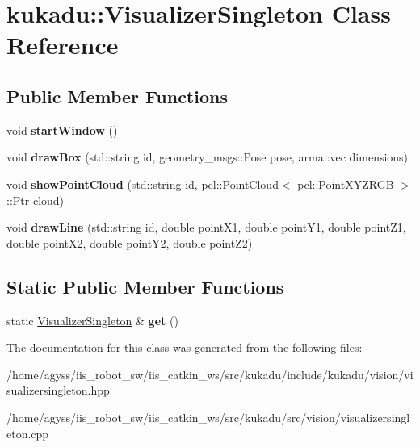 \hypertarget{classkukadu_1_1VisualizerSingleton}{}\section{kukadu\+:\+:Visualizer\+Singleton Class Reference}
\label{classkukadu_1_1VisualizerSingleton}
\subsection*{Public Member Functions}
\begin{DoxyCompactItemize}
\item 
void {\bfseries start\+Window} ()\hypertarget{classkukadu_1_1VisualizerSingleton_a79f0e92760dae5616f9534ee8033aa6d}{}\label{classkukadu_1_1VisualizerSingleton_a79f0e92760dae5616f9534ee8033aa6d}

\item 
void {\bfseries draw\+Box} (std\+::string id, geometry\+\_\+msgs\+::\+Pose pose, arma\+::vec dimensions)\hypertarget{classkukadu_1_1VisualizerSingleton_a153c7d591441f580b1a1599ee0184034}{}\label{classkukadu_1_1VisualizerSingleton_a153c7d591441f580b1a1599ee0184034}

\item 
void {\bfseries show\+Point\+Cloud} (std\+::string id, pcl\+::\+Point\+Cloud$<$ pcl\+::\+Point\+X\+Y\+Z\+R\+GB $>$\+::Ptr cloud)\hypertarget{classkukadu_1_1VisualizerSingleton_a6047d1a4619dd0fd7bcd8e684c04c946}{}\label{classkukadu_1_1VisualizerSingleton_a6047d1a4619dd0fd7bcd8e684c04c946}

\item 
void {\bfseries draw\+Line} (std\+::string id, double point\+X1, double point\+Y1, double point\+Z1, double point\+X2, double point\+Y2, double point\+Z2)\hypertarget{classkukadu_1_1VisualizerSingleton_aa6f85314a007cf7da65321d947977fbd}{}\label{classkukadu_1_1VisualizerSingleton_aa6f85314a007cf7da65321d947977fbd}

\end{DoxyCompactItemize}
\subsection*{Static Public Member Functions}
\begin{DoxyCompactItemize}
\item 
static \hyperlink{classkukadu_1_1VisualizerSingleton}{Visualizer\+Singleton} \& {\bfseries get} ()\hypertarget{classkukadu_1_1VisualizerSingleton_a4933414e0d7ab36b5d003abda2bb413c}{}\label{classkukadu_1_1VisualizerSingleton_a4933414e0d7ab36b5d003abda2bb413c}

\end{DoxyCompactItemize}


The documentation for this class was generated from the following files\+:\begin{DoxyCompactItemize}
\item 
/home/agyss/iis\+\_\+robot\+\_\+sw/iis\+\_\+catkin\+\_\+ws/src/kukadu/include/kukadu/vision/visualizersingleton.\+hpp\item 
/home/agyss/iis\+\_\+robot\+\_\+sw/iis\+\_\+catkin\+\_\+ws/src/kukadu/src/vision/visualizersingleton.\+cpp\end{DoxyCompactItemize}
